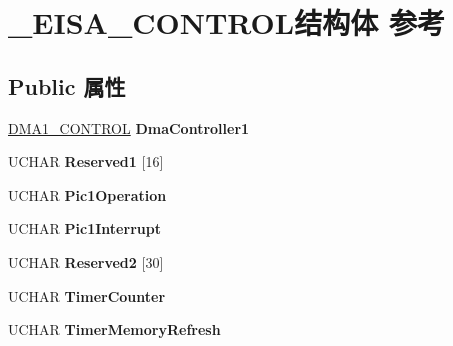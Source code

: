 \hypertarget{struct___e_i_s_a___c_o_n_t_r_o_l}{}\section{\+\_\+\+E\+I\+S\+A\+\_\+\+C\+O\+N\+T\+R\+O\+L结构体 参考}
\label{struct___e_i_s_a___c_o_n_t_r_o_l}
\subsection*{Public 属性}
\begin{DoxyCompactItemize}
\item 
\mbox{\label{struct___e_i_s_a___c_o_n_t_r_o_l_a8eadb1a7d54affeaff6fac7087ac1415}} 
\hyperlink{struct___d_m_a1___c_o_n_t_r_o_l}{D\+M\+A1\+\_\+\+C\+O\+N\+T\+R\+OL} {\bfseries Dma\+Controller1}
\item 
\mbox{\label{struct___e_i_s_a___c_o_n_t_r_o_l_ad3dc68227bb6416a7dc1714d532f2d77}} 
U\+C\+H\+AR {\bfseries Reserved1} \mbox{[}16\mbox{]}
\item 
\mbox{\label{struct___e_i_s_a___c_o_n_t_r_o_l_a04b39f2f4ead01446db52969ce2d21d1}} 
U\+C\+H\+AR {\bfseries Pic1\+Operation}
\item 
\mbox{\label{struct___e_i_s_a___c_o_n_t_r_o_l_a7e308ad4df9954a1e827310a630c1dac}} 
U\+C\+H\+AR {\bfseries Pic1\+Interrupt}
\item 
\mbox{\label{struct___e_i_s_a___c_o_n_t_r_o_l_a646daf10d3308d19061eb945b0b5a156}} 
U\+C\+H\+AR {\bfseries Reserved2} \mbox{[}30\mbox{]}
\item 
\mbox{\label{struct___e_i_s_a___c_o_n_t_r_o_l_a8d86f1e5f92d3901ca86d9bfcdc7c305}} 
U\+C\+H\+AR {\bfseries Timer\+Counter}
\item 
\mbox{\label{struct___e_i_s_a___c_o_n_t_r_o_l_ad91ea1915015e14147a596145b9bab76}} 
U\+C\+H\+AR {\bfseries Timer\+Memory\+Refresh}
\item 
\mbox{\label{struct___e_i_s_a___c_o_n_t_r_o_l_ab05f36ba0f4629a0ce17e1999ce53dd4}} 

\end{DoxyCompactItemize}
